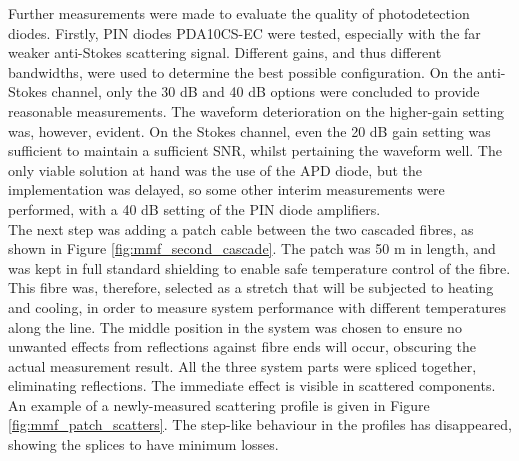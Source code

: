 \documentclass{standalone}
\begin{document}
Further measurements were made to evaluate the quality of photodetection diodes. Firstly, PIN diodes PDA10CS-EC were tested, especially with the far weaker anti-Stokes scattering signal. Different gains, and thus different bandwidths, were used to determine the best possible configuration. On the anti-Stokes channel, only the 30 dB and 40 dB options were concluded to provide reasonable measurements. The waveform deterioration on the higher-gain setting was, however, evident. On the Stokes channel, even the 20 dB gain setting was sufficient to maintain a sufficient SNR, whilst pertaining the waveform well. The only viable solution at hand was the use of the APD diode, but the implementation was delayed, so some other interim measurements were performed, with a 40 dB setting of the PIN diode amplifiers. \\

The next step was adding a patch cable between the two cascaded fibres, as shown in Figure \ref{fig:mmf_second_cascade}.
The patch was 50 m in length, and was kept in full standard shielding to enable safe temperature control of the fibre. This fibre was, therefore, selected as a stretch that will be subjected to heating and cooling, in order to measure system performance with different temperatures along the line. The middle position in the system was chosen to ensure no unwanted effects from reflections against fibre ends will occur, obscuring the actual measurement result. All the three system parts were spliced together, eliminating reflections. The immediate effect is visible in scattered components. An example of a newly-measured scattering profile is given in Figure \ref{fig:mmf_patch_scatters}.
The step-like behaviour in the profiles has disappeared, showing the splices to have minimum losses. \\
\end{document}
